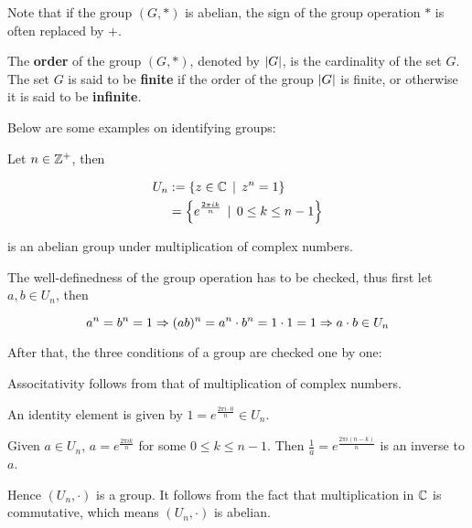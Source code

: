 \documentclass[a4paper,12pt]{article}
\begin{document}
Note that if the group $(G,*)$ is abelian, the sign of the group operation $*$ is often replaced by $+$.\n

\begin{dft}
  The \textbf{order} of the group $(G,*)$, denoted by $\left| G\right|$, is the cardinality of the set $G$. The set $G$ is said to be \textbf{finite} if the order of the group $\left| G\right|$ is finite, or otherwise it is said to be \textbf{infinite}.
\end{dft}\n

Below are some examples on identifying groups:\n

\begin{exm}
  Let $n\in\mathbb{Z}^{+}$, then

  $$\begin{aligned}[t]
    U_{n}&:=\left\{ z\in\mathbb{C}\,\mid\, z^{n}=1\right\}\\
    &=\left\{ e^{\frac{2\pi ik}{n}}\,\mid\, 0\leq k\leq n-1\right\}
  \end{aligned}$$\s

  is an abelian group under multiplication of complex numbers.\n

  \prf[zb] The well-definedness of the group operation has to be checked, thus first let $a,b\in U_{n}$, then

  $$a^{n}=b^{n}=1\\
  \Rightarrow(ab)^{n}=a^{n}\cdot b^{n}=1\cdot 1=1\\
  \Rightarrow a\cdot b\in U_{n}$$\s

  After that, the three conditions of a group are checked one by one:

  \begin{alist}
    \item Associtativity follows from that of multiplication of complex numbers.
    \item An identity element is given by $1=e^{\frac{2\pi i\cdot 0}{n}}\in U_{n}$.
    \item Given $a\in U_{n}$, $a=e^{\frac{2\pi ik}{n}}$ for some $0\leq k\leq n-1$. Then $\frac{1}{a}=e^{\frac{2\pi i(n-k)}{n}}$ is an inverse to $a$.
  \end{alist}

  Hence $(U_{n},\cdot)$ is a group. It follows from the fact that multiplication in $\mathbb{C}$ is commutative, which means $(U_{n},\cdot)$ is abelian.
\end{exm}\n
\end{document}

